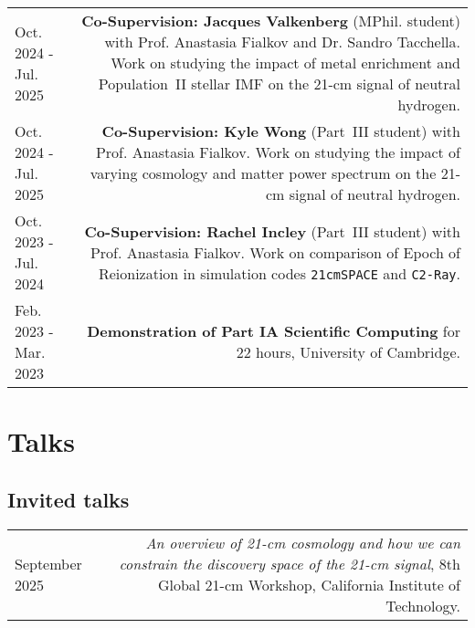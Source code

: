 \documentclass{article}
\begin{document}
\begin{longtable}{L!{\vrule}R}

	Oct. 2024 - Jul. 2025 & \textbf{Co-Supervision: Jacques Valkenberg} (MPhil. student) with Prof. Anastasia Fialkov and Dr. Sandro Tacchella. Work on studying the impact of metal enrichment and Population~II stellar IMF on the 21-cm signal of neutral hydrogen. \\

	Oct. 2024 - Jul. 2025 & \textbf{Co-Supervision: Kyle Wong} (Part~III student) with Prof. Anastasia Fialkov. Work on studying the impact of varying cosmology and matter power spectrum on the 21-cm signal of neutral hydrogen. \\

	Oct. 2023 - Jul. 2024 & \textbf{Co-Supervision: Rachel Incley} (Part~III student) with Prof. Anastasia Fialkov. Work on comparison of Epoch of Reionization in simulation codes \texttt{21cmSPACE} and \texttt{C2-Ray}. \\

  Feb. 2023 - Mar. 2023 & \textbf{Demonstration of Part IA Scientific Computing} for 22 hours, University of Cambridge.\\

\end{longtable}

\section*{Talks}

\subsection*{Invited talks}

\begin{longtable}{L!{\vrule}R}

    September 2025 & \textit{An overview of 21-cm cosmology and how we can constrain the discovery space of the 21-cm signal}, 8th Global 21-cm Workshop, California Institute of Technology. \\
\end{longtable}
\end{document}
